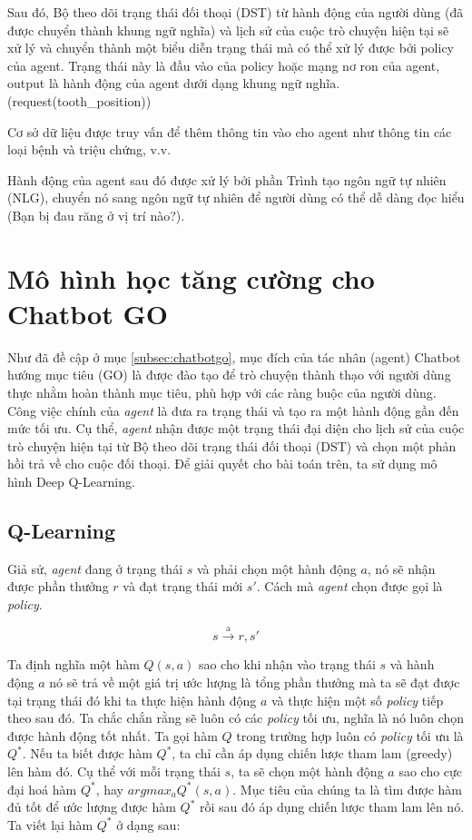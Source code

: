 Sau đó, Bộ theo dõi trạng thái đối thoại (DST) từ hành động của người dùng (đã được chuyển thành khung ngữ nghĩa) và lịch sử của cuộc trò chuyện hiện tại sẽ xử lý và chuyển thành một biểu diễn trạng thái mà có thể xử lý được bởi policy của agent. Trạng thái này là đầu vào của policy hoặc mạng nơ ron của agent, output là hành động của agent dưới dạng khung ngữ nghĩa. (request(tooth\_position))

Cơ sở dữ liệu được truy vấn để thêm thông tin vào cho agent như thông tin các loại bệnh và triệu chứng, v.v.

Hành động của agent sau đó được xử lý bởi phần Trình tạo ngôn ngữ tự nhiên (NLG), chuyển nó sang ngôn ngữ tự nhiên để người dùng có thể dễ dàng đọc hiểu (Bạn bị đau răng ở vị trí nào?).

\section{Mô hình học tăng cường cho Chatbot GO}
\label{sec:model}
Như đã đề cập ở mục \ref{subsec:chatbotgo}, mục đích của tác nhân (agent) Chatbot hướng mục tiêu (GO) là được đào tạo để trò chuyện thành thạo với người dùng thực nhằm hoàn thành mục tiêu, phù hợp với các ràng buộc của người dùng. Công việc chính của \textit{agent} là đưa ra trạng thái và tạo ra một hành động gần đến mức tối ưu. Cụ thể, \textit{agent} nhận được một trạng thái đại diện cho lịch sử của cuộc trò chuyện hiện tại từ Bộ theo dõi trạng thái đối thoại (DST) và chọn một phản hồi trả về cho cuộc đối thoại. Để giải quyết cho bài toán trên, ta sử dụng mô hình Deep Q-Learning.

\subsection{Q-Learning}
Giả sử, \textit{agent} đang ở trạng thái $s$ và phải chọn một hành động $a$, nó sẽ nhận được phần thưởng $r$ và đạt trạng thái mới $s'$. Cách mà \textit{agent} chọn được gọi là \textit{policy}.

\begin{equation*}
    s \xrightarrow{\text{a}} r,s'
\end{equation*}

Ta định nghĩa một hàm $Q(s,a)$ sao cho khi nhận vào trạng thái $s$ và hành động $a$ nó sẽ trả về một giá trị ước lượng là tổng phần thưởng mà ta sẽ đạt được tại trạng thái đó khi ta thực hiện hành động $a$ và thực hiện một số \textit{policy} tiếp theo sau đó. Ta chắc chắn rằng sẽ luôn có các \textit{policy} tối ưu, nghĩa là nó luôn chọn được hành động tốt nhất. Ta gọi hàm $Q$ trong trường hợp luôn có \textit{policy} tối ưu là $Q^*$. Nếu ta biết được hàm $Q^*$, ta chỉ cần áp dụng chiến lược tham lam (greedy) lên hàm đó. Cụ thể với mỗi trạng thái $s$, ta sẽ chọn một hành động $a$ sao cho cực đại hoá hàm $Q^*$, hay ${argmax_a}{Q^*}(s,a)$. Mục tiêu của chúng ta là tìm được hàm đủ tốt để ước lượng được hàm $Q^*$ rồi sau đó áp dụng chiến lược tham lam lên nó. Ta viết lại hàm $Q^*$ ở dạng sau:

